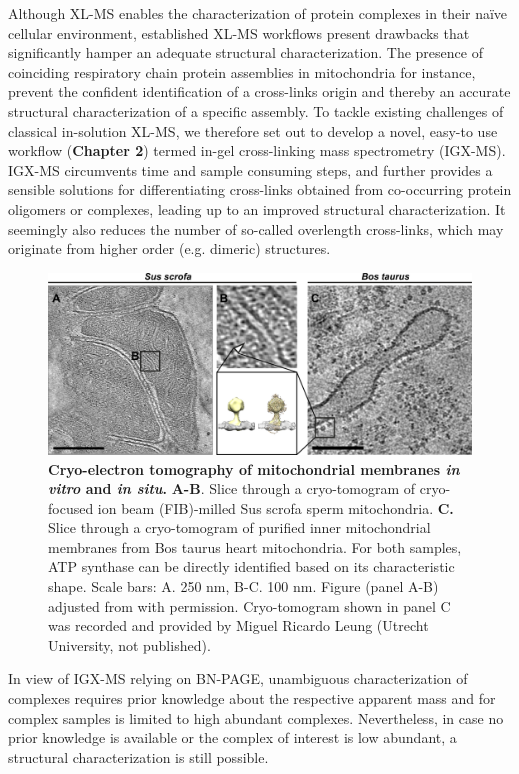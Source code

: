 Although XL-MS enables the characterization of protein complexes in their naïve cellular environment, established XL-MS workflows present drawbacks that significantly hamper an adequate structural characterization. The presence of coinciding respiratory chain protein assemblies in mitochondria \cite{RN3} for instance, prevent the confident identification of a cross-links origin and thereby an accurate structural characterization of a specific assembly. To tackle existing challenges of classical in-solution XL-MS, we therefore set out to develop a novel, easy-to use workflow (\textbf{Chapter 2}) termed in-gel cross-linking mass spectrometry (IGX-MS). IGX-MS circumvents time and sample consuming steps, and further provides a sensible solutions for differentiating cross-links obtained from co-occurring protein oligomers or complexes, leading up to an improved structural characterization. It seemingly also reduces the number of so-called overlength cross-links, which may originate from higher order (e.g. dimeric) structures.
\begin{figure}[hbt!]
    \center
    \includegraphics[width=\textwidth]{Chapter.6/Figures/Figure1.png}
    \caption{\textbf{Cryo-electron tomography of mitochondrial membranes \emph{in vitro} and \emph{in situ}.} \textbf{A-B}. Slice through a cryo-tomogram of cryo-focused ion beam (FIB)-milled Sus scrofa sperm mitochondria. \textbf{C.} Slice through a cryo-tomogram of purified inner mitochondrial membranes from Bos taurus heart mitochondria. For both samples, ATP synthase can be directly identified based on its characteristic shape. Scale bars: A. 250 nm, B-C. 100 nm. Figure (panel A-B) adjusted from \cite{RN2} with permission. Cryo-tomogram shown in panel C was recorded and provided by Miguel Ricardo Leung (Utrecht University, not published).}
    \label{fig:ch6_fig1}
\end{figure}
In view of IGX-MS relying on BN-PAGE, unambiguous characterization of complexes requires prior knowledge about the respective apparent mass and for complex samples is limited to high abundant complexes.
Nevertheless, in case no prior knowledge is available or the complex of interest is low abundant, a structural characterization is still possible.

